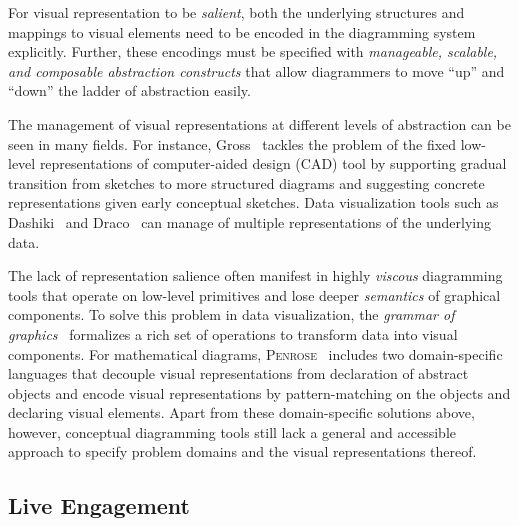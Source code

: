For visual representation to be \emph{salient}, both the underlying structures and mappings to visual elements need to be encoded in the diagramming system explicitly. Further, these encodings must be specified with \emph{manageable, scalable, and composable abstraction constructs} that allow diagrammers to move ``up'' and ``down'' the ladder of abstraction easily.

The management of visual representations at different levels of abstraction can be seen in many fields. For instance, Gross \cite{cocktailNapkins}~tackles the problem of the fixed low-level representations of computer-aided design (CAD) tool by supporting gradual transition from sketches to more structured diagrams and suggesting concrete representations given early conceptual sketches. Data visualization tools such as Dashiki~\cite{dashiki} and Draco~\cite{Draco} can manage of multiple representations of the underlying data. 

The lack of representation salience often manifest in highly \emph{viscous} diagramming tools that operate on low-level primitives and lose deeper \emph{semantics} of graphical components. To solve this problem in data visualization, the \emph{grammar of graphics}~\cite{GrammarOfGraphics} formalizes a rich set of operations to transform data into visual components. For mathematical diagrams, \textsc{Penrose}~\cite{DSLDI} includes two domain-specific languages that decouple visual representations from declaration of abstract objects and encode visual representations by pattern-matching on the objects and declaring visual elements. Apart from these domain-specific solutions above, however, conceptual diagramming tools still lack a general and accessible approach to specify problem domains and the visual representations thereof. 

\subsection{Live Engagement}

